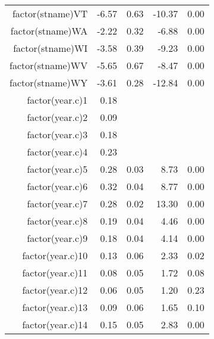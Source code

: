 \begin{table}[ht]
\begin{tabular}{rrrrr}
  factor(stname)VT & -6.57 & 0.63 & -10.37 & 0.00 \\ 
  factor(stname)WA & -2.22 & 0.32 & -6.88 & 0.00 \\ 
  factor(stname)WI & -3.58 & 0.39 & -9.23 & 0.00 \\ 
  factor(stname)WV & -5.65 & 0.67 & -8.47 & 0.00 \\ 
  factor(stname)WY & -3.61 & 0.28 & -12.84 & 0.00 \\ 
  factor(year.c)1 & 0.18 &  &  &  \\ 
  factor(year.c)2 & 0.09 &  &  &  \\ 
  factor(year.c)3 & 0.18 &  &  &  \\ 
  factor(year.c)4 & 0.23 &  &  &  \\ 
  factor(year.c)5 & 0.28 & 0.03 & 8.73 & 0.00 \\ 
  factor(year.c)6 & 0.32 & 0.04 & 8.77 & 0.00 \\ 
  factor(year.c)7 & 0.28 & 0.02 & 13.30 & 0.00 \\ 
  factor(year.c)8 & 0.19 & 0.04 & 4.46 & 0.00 \\ 
  factor(year.c)9 & 0.18 & 0.04 & 4.14 & 0.00 \\ 
  factor(year.c)10 & 0.13 & 0.06 & 2.33 & 0.02 \\ 
  factor(year.c)11 & 0.08 & 0.05 & 1.72 & 0.08 \\ 
  factor(year.c)12 & 0.06 & 0.05 & 1.20 & 0.23 \\ 
  factor(year.c)13 & 0.09 & 0.06 & 1.65 & 0.10 \\ 
  factor(year.c)14 & 0.15 & 0.05 & 2.83 & 0.00 \\ 
   \hline
\end{tabular}
\end{table}
